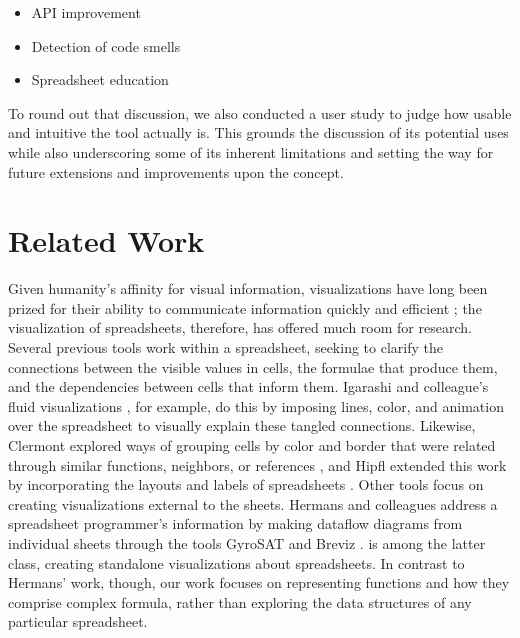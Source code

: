 \documentclass[conference]{IEEEtran}
\begin{document}
	\begin{itemize} \item API improvement \item Detection of code smells \item
		Spreadsheet education \end{itemize}
	
	To round out that discussion, we also conducted a user study to judge how
	usable and intuitive the tool actually is. This grounds the discussion of its
	potential uses while also underscoring some of its inherent limitations and
	setting the way for future extensions and improvements upon the concept.
	
	\section{Related Work} \label{related-work} Given humanity's affinity for visual information,
	visualizations have long been prized for their ability to communicate
	information quickly and efficient \cite{baeza1999modern}; the visualization of
	spreadsheets, therefore, has offered much room for research. Several previous
	tools work within a spreadsheet, seeking to clarify the connections between the
	visible values in cells, the formulae that produce them, and the dependencies
	between cells that inform them. Igarashi and colleague's fluid visualizations
	\cite{igarashi1998fluid}, for example, do this by imposing lines, color, and
	animation over the spreadsheet to visually explain these tangled connections.
	Likewise, Clermont explored ways of grouping cells by color and border that
	were related through similar functions, neighbors, or references
	\cite{clermont2003scalable}, and Hipfl extended this work by incorporating the
	layouts and labels of spreadsheets \cite{hipfl2008using}. Other tools focus on
	creating visualizations external to the sheets. Hermans and colleagues address
	a spreadsheet programmer's information by making dataflow diagrams from
	individual sheets through the tools GyroSAT \cite{hermans2011supporting} and
	Breviz \cite{hermans2011breviz}. \toolname is among the latter class, creating
	standalone visualizations about spreadsheets. In contrast to Hermans' work,
	though, our work focuses on representing functions and how they comprise
	complex formula, rather than exploring the data structures of any particular
	spreadsheet.  \par
	
\end{document}
